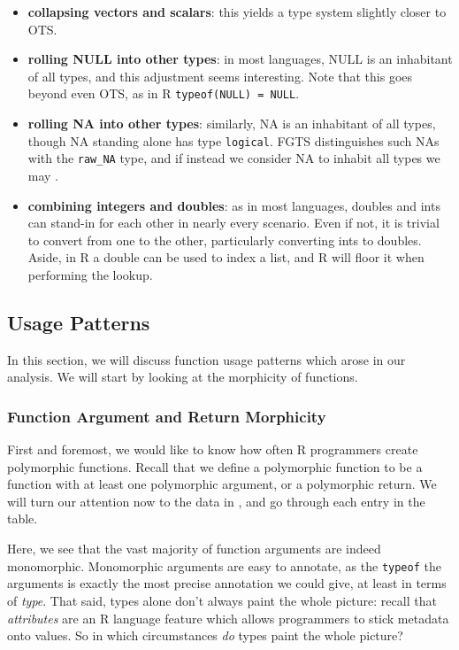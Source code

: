 \documentclass[acmsmall,10pt,review,anonymous]{acmart}\settopmatter{printfolios=true,printccs=false,printacmref=false}
\begin{document}
\begin{itemize}

\item {\bf collapsing vectors and scalars}: this yields a type system slightly closer to OTS.

\item {\bf rolling NULL into other types}: in most languages, NULL is an inhabitant of all types, and this adjustment seems interesting.
Note that this goes beyond even OTS, as in R {\tt typeof(NULL) = NULL}.

\item {\bf rolling NA into other types}: 
similarly, NA is an inhabitant of all types, though NA standing alone has type {\tt logical}.
FGTS distinguishes such NAs with the {\tt raw\_NA} type, and if instead we consider NA to inhabit all types we may .

\item {\bf combining integers and doubles}: as in most languages, doubles and ints can stand-in for each other in nearly every scenario.
Even if not, it is trivial to convert from one to the other, particularly converting ints to doubles.
Aside, in R a double can be used to index a list, and R will floor it when performing the lookup.

\end{itemize}

%
%
%
%
\subsection{Usage Patterns}

In this section, we will discuss function usage patterns which arose in our analysis.
We will start by looking at the morphicity of functions.

\subsubsection{Function Argument and Return Morphicity}

First and foremost, we would like to know how often R programmers create polymorphic functions.
Recall that we define a polymorphic function to be a function with at least one polymorphic argument, or a polymorphic return.
We will turn our attention now to the data in , and go through each entry in the table.

Here, we see that the vast majority of function arguments are indeed monomorphic.
Monomorphic arguments are easy to annotate, as the {\tt typeof} the arguments is exactly the most precise annotation we could give, at least in terms of \textit{type}.
That said, types alone don't always paint the whole picture:
recall that \textit{attributes} are an R language feature which allows programmers to stick metadata onto values.
So in which circumstances \textit{do} types paint the whole picture?
\end{document}
